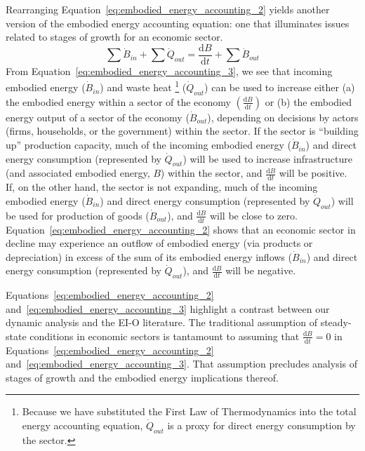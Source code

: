 Rearranging Equation~\ref{eq:embodied_energy_accounting_2}
yields another version of the embodied energy accounting equation:
one that illuminates issues related to 
stages of growth for an economic sector.
%
\begin{equation} \label{eq:embodied_energy_accounting_3}
	\sum \dot{B}_{in}
	+ \sum \dot{Q}_{out}
	= \frac{\mathrm{d}B}{\mathrm{d}t} 
	+ \sum \dot{B}_{out}
\end{equation}
%
From Equation~\ref{eq:embodied_energy_accounting_3},
we see that incoming embodied energy ($\dot{B}_{in}$) and 
waste heat%
	\footnote{  %
	Because we have substituted 
	the First Law of Thermodynamics
	into the total energy accounting equation,
	$\dot{Q}_{out}$ is a proxy for direct energy consumption by the sector.
	} 
($\dot{Q}_{out}$) can be used to increase either (a)
the embodied energy within a sector of the economy 
$\left( \frac{\mathrm{d}B}{\mathrm{d}t}  \right)$
or (b) the embodied energy output of a sector of the economy 
($\dot{B}_{out}$), 
depending on decisions by actors 
(firms, households, or the government) 
within the sector. 
If the sector is ``building up'' production capacity, 
much of the incoming embodied energy ($\dot{B}_{in}$)
and direct energy consumption (represented by $\dot{Q}_{out}$)
will be used to increase infrastructure 
(and associated embodied energy, $B$) within the sector, 
and $\frac{\mathrm{d}B}{\mathrm{d}t}$ will be positive.
If, on the other hand, the sector is not expanding, 
much of the incoming embodied energy ($\dot{B}_{in}$)
and direct energy consumption (represented by $\dot{Q}_{out}$)
will be used for production of goods ($\dot{B}_{out}$),
and $\frac{\mathrm{d}B}{\mathrm{d}t}$ will be close to zero.
Equation~\ref{eq:embodied_energy_accounting_2} shows that
an economic sector in decline may experience an outflow 
of embodied energy (via products or depreciation)
in excess of the sum of 
its embodied energy inflows ($\dot{B}_{in}$)
and direct energy consumption (represented by $\dot{Q}_{out}$),
and $\frac{\mathrm{d}B}{\mathrm{d}t}$ will be negative.

Equations~\ref{eq:embodied_energy_accounting_2}
and~\ref{eq:embodied_energy_accounting_3} 
highlight a contrast between 
our dynamic analysis and the EI-O literature.
The traditional assumption of steady-state conditions 
in economic sectors is tantamount to assuming that
$\frac{\mathrm{d}B}{\mathrm{d}t} = 0$ in 
Equations~\ref{eq:embodied_energy_accounting_2}
and~\ref{eq:embodied_energy_accounting_3}.
That assumption precludes analysis of stages of growth 
and the embodied energy implications thereof.


